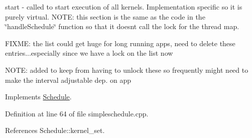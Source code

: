 start -\/ called to start execution of all kernels. Implementation specific so it is purely virtual. N\+O\+TE\+: this section is the same as the code in the \char`\"{}handle\+Schedule\char`\"{} function so that it doesn\textquotesingle{}t call the lock for the thread map.

F\+I\+X\+ME\+: the list could get huge for long running apps, need to delete these entries...especially since we have a lock on the list now

N\+O\+TE\+: added to keep from having to unlock these so frequently might need to make the interval adjustable dep. on app

Implements \hyperlink{class_schedule_ab6ad5540ecdef6b472b4e8242a47c4ee}{Schedule}.



Definition at line 64 of file simpleschedule.\+cpp.



References Schedule\+::kernel\+\_\+set.


